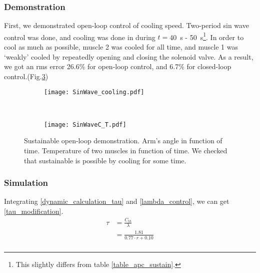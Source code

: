 \subsubsection{Demonstration}
First, we demonstrated open-loop control of cooling speed. Two-period sin wave control was done, and cooling was done in during $t=$\SI{40}{\second} - \SI{50}{\second}\footnote{This slightly differs from table \ref{table_apc_sustain}.}. In order to cool as much as possible, muscle 2 was cooled for all time, and muscle 1 was `weakly' cooled by repeatedly opening and closing the solenoid valve. As a result, we got an rms error 26.6\% for open-loop control, and 6.7\% for closed-loop control.(Fig.\ref{sustain_demo})

\begin{figure}[t]
	\centering
	\begin{subfigure}[t]{0.47\textwidth}
		\texttt{[image: SinWave\_cooling.pdf]}
		\caption{\label{SinWave_cooling}}
	\end{subfigure}
	~
	\begin{subfigure}[t]{0.46\textwidth}
		\texttt{[image: SinWaveC\_T.pdf]}
		\caption{\label{Sinwave_C_T}}
	\end{subfigure}
	\caption[Sustainable Open-Loop \APC Demonstration]{Sustainable open-loop \apc demonstration.  Arm's angle in function of time.  Temperature of two muscles in function of time. We checked that sustainable \apc is possible by cooling for some time.}
	\label{sustain_demo}
\end{figure}

\subsubsection{Simulation}


Integrating \eqref{dynamic_calculation_tau} and \eqref{lambda_control}, we can get \eqref{tau_modification}.
\begin{equation} \label{tau_modification} 
\begin{aligned} 
\tau & = \frac{C_{th}}{\lambda} \\
& = \frac{1.81}{0.77\cdot r + 0.10} \\ 
\end{aligned}
\end{equation}

